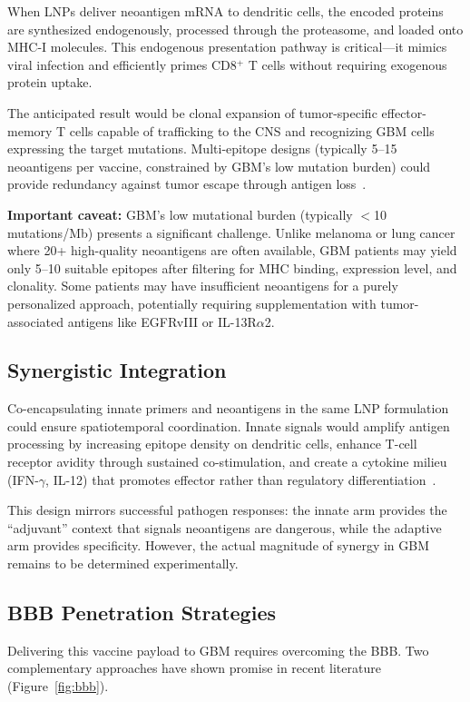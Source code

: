 \documentclass[12pt]{article}
\begin{document}
When LNPs deliver neoantigen mRNA to dendritic cells, the encoded proteins are synthesized endogenously, processed through the proteasome, and loaded onto MHC-I molecules. This endogenous presentation pathway is critical—it mimics viral infection and efficiently primes CD8$^+$ T cells without requiring exogenous protein uptake.

The anticipated result would be clonal expansion of tumor-specific effector-memory T cells capable of trafficking to the CNS and recognizing GBM cells expressing the target mutations. Multi-epitope designs (typically 5--15 neoantigens per vaccine, constrained by GBM's low mutation burden) could provide redundancy against tumor escape through antigen loss~\citep{wang2025,hilf2024}.

\textbf{Important caveat:} GBM's low mutational burden (typically $<$10 mutations/Mb) presents a significant challenge. Unlike melanoma or lung cancer where 20+ high-quality neoantigens are often available, GBM patients may yield only 5--10 suitable epitopes after filtering for MHC binding, expression level, and clonality. Some patients may have insufficient neoantigens for a purely personalized approach, potentially requiring supplementation with tumor-associated antigens like EGFRvIII or IL-13R$\alpha$2.

\subsection{Synergistic Integration}
Co-encapsulating innate primers and neoantigens in the same LNP formulation could ensure spatiotemporal coordination. Innate signals would amplify antigen processing by increasing epitope density on dendritic cells, enhance T-cell receptor avidity through sustained co-stimulation, and create a cytokine milieu (IFN-$\gamma$, IL-12) that promotes effector rather than regulatory differentiation~\citep{oloruntimehin2025}.

This design mirrors successful pathogen responses: the innate arm provides the ``adjuvant'' context that signals neoantigens are dangerous, while the adaptive arm provides specificity. However, the actual magnitude of synergy in GBM remains to be determined experimentally.

\subsection{BBB Penetration Strategies}
Delivering this vaccine payload to GBM requires overcoming the BBB. Two complementary approaches have shown promise in recent literature (Figure~\ref{fig:bbb}).
\end{document}
